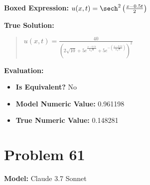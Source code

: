 \documentclass{article}
\begin{document}
\textbf{Boxed Expression:} $u(x,t) = \sech^2\left(\frac{x-0.5t}{2}\right)$

\textbf{True Solution:}
\begin{quote}
$u(x,t) = \frac{40}{\left(2\sqrt{10}+5e^{\frac{x-0.5t}{2\sqrt{2}}} + 5e^{-\left(\frac{x-0.5t}{2\sqrt{2}}\right)}\right)^2}$
\end{quote}

\textbf{Evaluation:}
\begin{itemize}
\item \textbf{Is Equivalent?} No
\item \textbf{Model Numeric Value:} 0.961198
\item \textbf{True Numeric Value:} 0.148281
\end{itemize}
\vspace{1cm}
\section*{Problem 61}
\textbf{Model:} Claude 3.7 Sonnet
\end{document}

